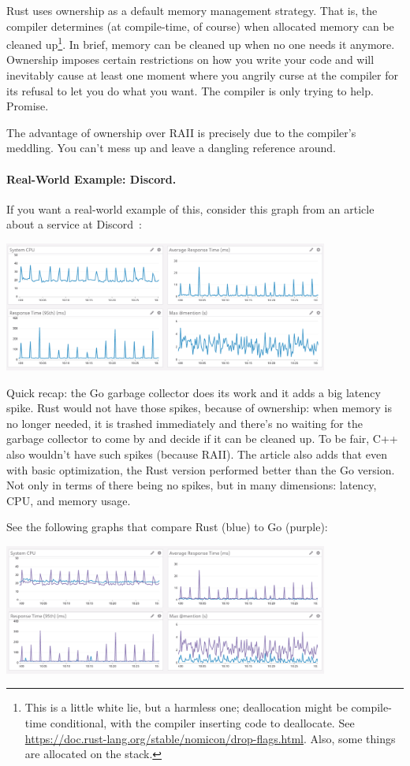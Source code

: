 \documentclass[a4paper]{report}
\begin{document}
Rust uses ownership as a default memory management strategy. That is, the compiler determines (at compile-time, of course) when allocated memory can be cleaned up\footnote{This is a little white lie, but a harmless one; deallocation might be compile-time conditional, with the compiler inserting code to deallocate. See \url{https://doc.rust-lang.org/stable/nomicon/drop-flags.html}. Also, some things are allocated on the stack.}. In brief, memory can be cleaned up when no one needs it anymore. Ownership imposes certain restrictions on how you write your code and will inevitably cause at least one moment where you angrily curse at the compiler for its refusal to let you do what you want. The compiler is only trying to help. Promise.

The advantage of ownership over RAII is precisely due to the compiler's meddling. You can't mess up and leave a dangling reference around.

\paragraph{Real-World Example: Discord.} If you want a real-world example of this, consider this graph from an article about a service at Discord~\cite{discord}:

\begin{center}
\includegraphics[width=0.8\textwidth]{images/golang-gc.png}
\end{center}

Quick recap: the Go garbage collector does its work and it adds a big latency spike. Rust would not have those spikes, because of ownership: when memory is no longer needed, it is trashed immediately and there's no waiting for the garbage collector to come by and decide if it can be cleaned up. To be fair, C++ also wouldn't have such spikes (because RAII). The article also adds that even with basic optimization, the Rust version performed better than the Go version. Not only in terms of there being no spikes, but in many dimensions: latency, CPU, and memory usage.

See the following graphs that compare Rust (blue) to Go (purple): 
\begin{center}
\includegraphics[width=0.8\textwidth]{images/rust-vs-go.png}
\end{center}
\end{document}
